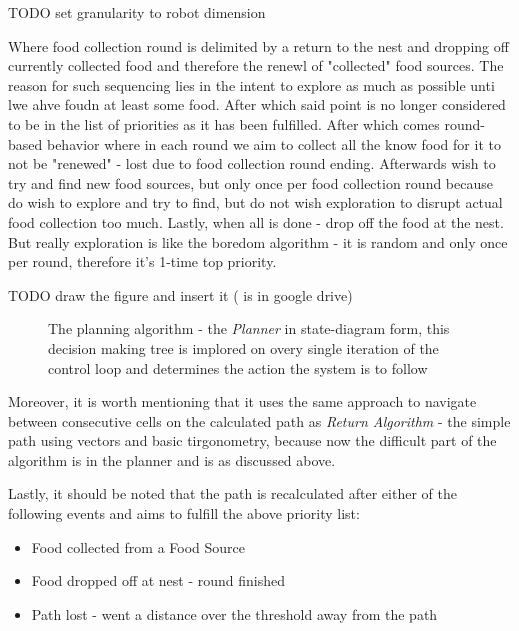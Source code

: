 \documentclass[11pt, a4paper]{article}
\begin{document}
TODO set granularity to robot dimension

Where food collection round is delimited by a return to the nest and dropping off currently collected food and therefore the renewl of "collected" food sources. The reason for such sequencing lies in the intent to explore as much as possible unti lwe ahve foudn at least some food. After which said point is no longer considered to be in the list of priorities as it has been fulfilled. After which comes round-based behavior where in each round we aim to collect all the know food for it to not be "renewed" - lost due to food collection round ending. Afterwards wish to try and find new food sources, but only once per food collection round  because do wish to explore and try to find, but do not wish exploration to disrupt actual food collection too much. Lastly, when all is done - drop off the food at the nest. But really exploration is like the boredom algorithm - it is random and only once per round, therefore it's 1-time top priority.

TODO draw the figure and insert it ( is in google drive)

\begin{figure}
	  \caption{The planning algorithm - the \textit{Planner} in state-diagram form, this decision making tree is 
           implored on overy single iteration of the control loop and determines the action the system is to follow}
	  \label{fig_planning_internal}
\end{figure} 

Moreover, it is worth mentioning that it uses the same approach to navigate between consecutive cells on the calculated path as \textit{Return Algorithm}\cite{task2_report} - the simple path using vectors and basic tirgonometry, because now the difficult part of the algorithm is in the planner and is as discussed above. 

Lastly, it should be noted that the path is recalculated after either of the following events and aims to fulfill the above priority list:

\begin{itemize}

	\item Food collected from a Food Source
	\item Food dropped off at nest - round finished
	\item Path lost - went a distance over the threshold away from the path

\end{itemize}
\end{document}
